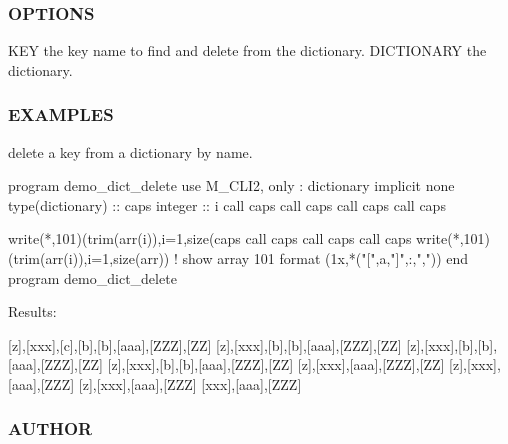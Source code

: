 \subsubsection*{O\+P\+T\+I\+O\+NS}

\begin{DoxyVerb}KEY           the key name to find and delete from the dictionary.
DICTIONARY    the dictionary.
\end{DoxyVerb}


\subsubsection*{E\+X\+A\+M\+P\+L\+ES}

delete a key from a dictionary by name. \begin{DoxyVerb}program demo_dict_delete
use M_CLI2, only : dictionary
implicit none
type(dictionary) :: caps
integer                       :: i
call caps%
call caps%
call caps%
call caps%

write(*,101)(trim(arr(i)),i=1,size(caps%
call  caps%
call  caps%
call  caps%
write(*,101)(trim(arr(i)),i=1,size(arr)) ! show array
101 format (1x,*("[",a,"]",:,","))
end program demo_dict_delete
\end{DoxyVerb}


Results\+:

\mbox{[}z\mbox{]},\mbox{[}xxx\mbox{]},\mbox{[}c\mbox{]},\mbox{[}b\mbox{]},\mbox{[}b\mbox{]},\mbox{[}aaa\mbox{]},\mbox{[}Z\+ZZ\mbox{]},\mbox{[}ZZ\mbox{]} \mbox{[}z\mbox{]},\mbox{[}xxx\mbox{]},\mbox{[}b\mbox{]},\mbox{[}b\mbox{]},\mbox{[}aaa\mbox{]},\mbox{[}Z\+ZZ\mbox{]},\mbox{[}ZZ\mbox{]} \mbox{[}z\mbox{]},\mbox{[}xxx\mbox{]},\mbox{[}b\mbox{]},\mbox{[}b\mbox{]},\mbox{[}aaa\mbox{]},\mbox{[}Z\+ZZ\mbox{]},\mbox{[}ZZ\mbox{]} \mbox{[}z\mbox{]},\mbox{[}xxx\mbox{]},\mbox{[}b\mbox{]},\mbox{[}b\mbox{]},\mbox{[}aaa\mbox{]},\mbox{[}Z\+ZZ\mbox{]},\mbox{[}ZZ\mbox{]} \mbox{[}z\mbox{]},\mbox{[}xxx\mbox{]},\mbox{[}aaa\mbox{]},\mbox{[}Z\+ZZ\mbox{]},\mbox{[}ZZ\mbox{]} \mbox{[}z\mbox{]},\mbox{[}xxx\mbox{]},\mbox{[}aaa\mbox{]},\mbox{[}Z\+ZZ\mbox{]} \mbox{[}z\mbox{]},\mbox{[}xxx\mbox{]},\mbox{[}aaa\mbox{]},\mbox{[}Z\+ZZ\mbox{]} \mbox{[}xxx\mbox{]},\mbox{[}aaa\mbox{]},\mbox{[}Z\+ZZ\mbox{]}

\subsubsection*{A\+U\+T\+H\+OR}

